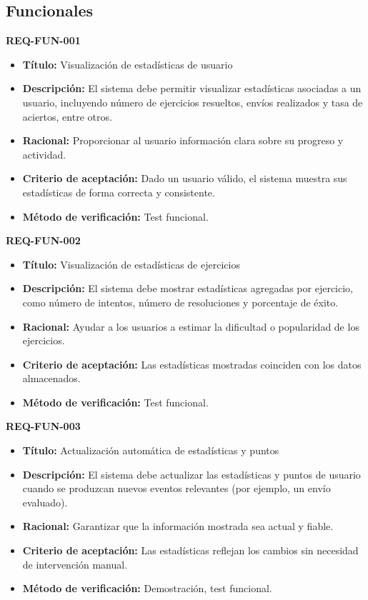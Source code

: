 \subsection{Funcionales}

\textbf{REQ-FUN-001}
\begin{itemize}
    \item \textbf{Título:} Visualización de estadísticas de usuario
    \item \textbf{Descripción:} El sistema debe permitir visualizar estadísticas asociadas a un usuario, incluyendo número de ejercicios resueltos, envíos realizados y tasa de aciertos, entre otros.
    \item \textbf{Racional:} Proporcionar al usuario información clara sobre su progreso y actividad.
    \item \textbf{Criterio de aceptación:} Dado un usuario válido, el sistema muestra sus estadísticas de forma correcta y consistente.
    \item \textbf{Método de verificación:} Test funcional.

\end{itemize}

\textbf{REQ-FUN-002}
\begin{itemize}
    \item \textbf{Título:} Visualización de estadísticas de ejercicios
    \item \textbf{Descripción:} El sistema debe mostrar estadísticas agregadas por ejercicio, como número de intentos, número de resoluciones y porcentaje de éxito.
    \item \textbf{Racional:} Ayudar a los usuarios a estimar la dificultad o popularidad de los ejercicios.
    \item \textbf{Criterio de aceptación:} Las estadísticas mostradas coinciden con los datos almacenados.
    \item \textbf{Método de verificación:} Test funcional.

\end{itemize}

\textbf{REQ-FUN-003}
\begin{itemize}
    \item \textbf{Título:} Actualización automática de estadísticas y puntos
    \item \textbf{Descripción:} El sistema debe actualizar las estadísticas y puntos de usuario cuando se produzcan nuevos eventos relevantes (por ejemplo, un envío evaluado).
    \item \textbf{Racional:} Garantizar que la información mostrada sea actual y fiable.
    \item \textbf{Criterio de aceptación:} Las estadísticas reflejan los cambios sin necesidad de intervención manual.
    \item \textbf{Método de verificación:} Demostración, test funcional.

\end{itemize}

